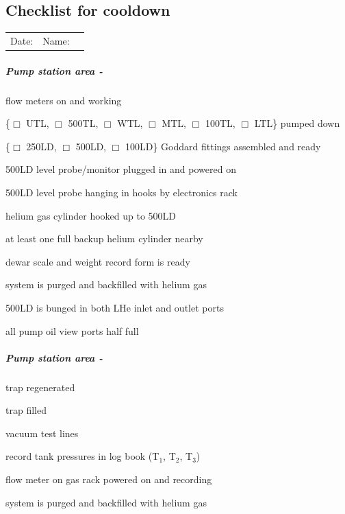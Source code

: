 \begin{appendices}
\noappendicestocpagenum
\addappheadtotoc
\chapter{Checklist for cooldown}
\label{appendix:checklist-for-cooldown}


\begin{tabular}{ l r c }
  Date: \underline{\hspace{4cm}} & Name: \underline{\hspace{4cm}}
\end{tabular}

\paragraph{Pump station area - \hef}

\begin{checklist}
 \item flow meters on and working
 \item \{$\Box$ UTL, $\Box$ 500TL, $\Box$ WTL, $\Box$ MTL, $\Box$ 100TL, $\Box$ LTL\} pumped down
 \item \{$\Box$ 250LD, $\Box$ 500LD, $\Box$ 100LD\} Goddard fittings assembled and ready
 \item 500LD level probe/monitor plugged in and powered on
 \item 500LD level probe hanging in hooks by electronics rack
 \item helium gas cylinder hooked up to 500LD
 \item at least one full backup helium cylinder nearby
 \item dewar scale and weight record form is ready
 \item system is purged and backfilled with helium gas
 \item 500LD is bunged in both LHe inlet and outlet ports
 \item all pump oil view ports half full
 
\end{checklist}

\paragraph{Pump station area - \het}
\begin{checklist}
 \item \lnn{} trap regenerated
 \item \lnn{} trap filled
 \item vacuum test \het{} lines
 \item record \het{} tank pressures in log book (T$_1$, T$_2$, T$_3$)
 \item flow meter on \het{} gas rack powered on and recording
 \item system is purged and backfilled with helium gas 
\end{checklist}


\end{appendices}
